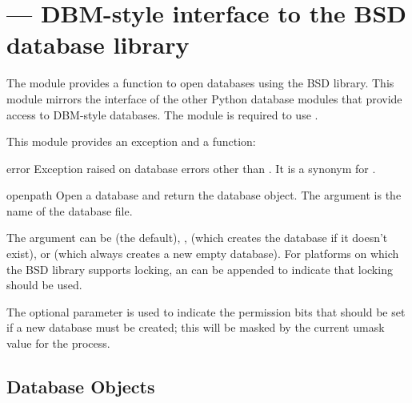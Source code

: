 \section{ ---
         DBM-style interface to the BSD database library}



The  module provides a function to open databases using
the BSD  library.  This module mirrors the interface of the
other Python database modules that provide access to DBM-style
databases.  The  module is required 
to use .

This module provides an exception and a function:


\begin{excdesc}{error}
  Exception raised on database errors other than
  .  It is a synonym for .
\end{excdesc}

\begin{funcdesc}{open}{path}
  Open a  database and return the database object.  The
   argument is the name of the database file.

  The  argument can be
   (the default), ,
   (which creates the database if it doesn't exist), or
   (which always creates a new empty database).
  For platforms on which the BSD  library supports locking,
  an  can be appended to indicate that locking should be
  used.

  The optional  parameter is used to indicate the \UNIX{}
  permission bits that should be set if a new database must be
  created; this will be masked by the current umask value for the
  process.
\end{funcdesc}


\begin{seealso}
\end{seealso}


\subsection{Database Objects \label{dbhash-objects}}

